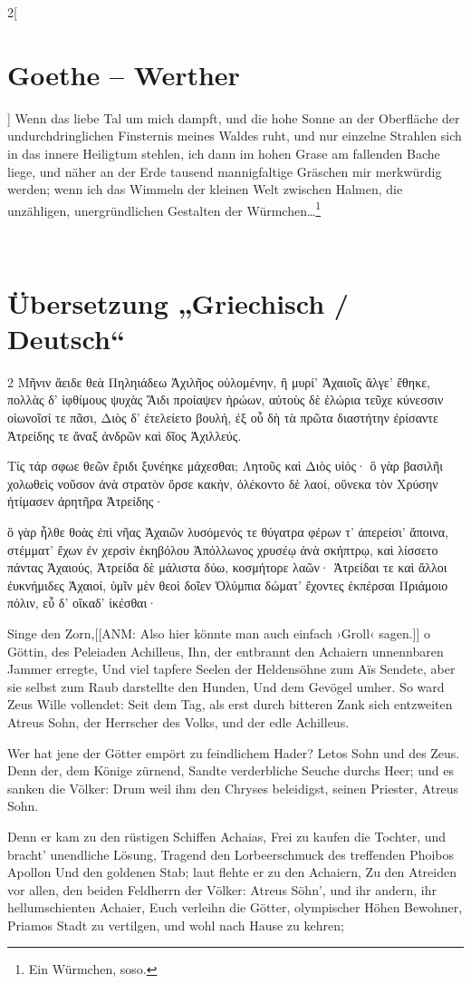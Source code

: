\begin{multicols}{2}[\section{Goethe – Werther}]
Wenn das liebe Tal um mich dampft, und die hohe Sonne an der Oberfläche der undurchdringlichen Finsternis meines Waldes ruht, und nur einzelne Strahlen sich in das innere Heiligtum stehlen, ich dann im hohen Grase am fallenden Bache liege, und näher an der Erde tausend mannigfaltige Gräschen mir merkwürdig werden; wenn ich das Wimmeln der kleinen Welt zwischen Halmen, die unzähligen, unergründlichen Gestalten der Würmchen…\footnote{Ein Würmchen, soso.}
\end{multicols}
 
\section{Übersetzung „Griechisch / Deutsch“}
\begin{multicols}{2}
Μῆνιν ἄειδε θεὰ Πηληιάδεω Ἀχιλῆος 
οὐλομένην, ἣ μυρί' Ἀχαιοῖς ἄλγε' ἔθηκε, 
πολλὰς δ' ἰφθίμους ψυχὰς Ἄιδι προίαψεν 
ἡρώων, αὐτοὺς δὲ ἑλώρια τεῦχε κύνεσσιν	
οἰωνοῖσί τε πᾶσι, Διὸς δ' ἐτελείετο βουλή, 
ἐξ οὗ δὴ τὰ πρῶτα διαστήτην ἐρίσαντε 
Ἀτρείδης τε ἄναξ ἀνδρῶν καὶ δῖος Ἀχιλλεύς. 

Τίς τάρ σφωε θεῶν ἔριδι ξυνέηκε μάχεσθαι; 
Λητοῦς καὶ Διὸς υἱός· ὃ γὰρ βασιλῆι χολωθεὶς 
νοῦσον ἀνὰ στρατὸν ὄρσε κακήν, ὀλέκοντο δὲ λαοί, 
οὕνεκα τὸν Xρύσην ἠτίμασεν ἀρητῆρα 
Ἀτρείδης·

ὃ γὰρ ἦλθε θοὰς ἐπὶ νῆας Ἀχαιῶν
λυσόμενός τε θύγατρα φέρων τ' ἀπερείσι' ἄποινα, 
στέμματ' ἔχων ἐν χερσὶν ἑκηβόλου Ἀπόλλωνος
χρυσέῳ ἀνὰ σκήπτρῳ, καὶ λίσσετο πάντας Ἀχαιούς, 
Ἀτρείδα δὲ μάλιστα δύω, κοσμήτορε λαῶν· 
Ἀτρείδαι τε καὶ ἄλλοι ἐυκνήμιδες Ἀχαιοί, 
ὑμῖν μὲν θεοὶ δοῖεν Ὀλύμπια δώματ' ἔχοντες 
ἐκπέρσαι Πριάμοιο πόλιν, εὖ δ' οἴκαδ' ἱκέσθαι·
\columnbreak

Singe den Zorn,[[ANM: Also hier könnte man auch einfach ›Groll‹ sagen.]] o Göttin, des Peleiaden Achilleus, 
Ihn, der entbrannt den Achaiern unnennbaren Jammer erregte,
Und viel tapfere Seelen der Heldensöhne zum Aïs
Sendete, aber sie selbst zum Raub darstellte den Hunden,
Und dem Gevögel umher. So ward Zeus Wille vollendet:
Seit dem Tag, als erst durch bitteren Zank sich entzweiten
Atreus Sohn, der Herrscher des Volks, und der edle Achilleus.

Wer hat jene der Götter empört zu feindlichem Hader?
Letos Sohn und des Zeus. Denn der, dem Könige zürnend,
Sandte verderbliche Seuche durchs Heer; und es sanken die Völker:
Drum weil ihm den Chryses beleidigst, seinen Priester,
Atreus Sohn.

Denn er kam zu den rüstigen Schiffen Achaias,
Frei zu kaufen die Tochter, und bracht' unendliche Lösung,
Tragend den Lorbeerschmuck des treffenden Phoibos Apollon
Und den goldenen Stab; laut flehte er zu den Achaiern,
Zu den Atreiden vor allen, den beiden Feldherrn der Völker: 
Atreus Söhn', und ihr andern, ihr hellumschienten Achaier,
Euch verleihn die Götter, olympischer Höhen Bewohner,
Priamos Stadt zu vertilgen, und wohl nach Hause zu kehren;
\end{multicols}
\clearpage

